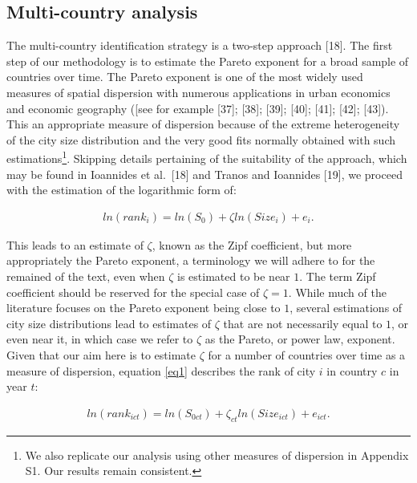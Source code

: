 \documentclass[10pt,letterpaper]{article}
\begin{document}
\hypertarget{sec3.1}{%
\subsection{Multi-country analysis}\label{sec3.1}}

The multi-country identification strategy is a two-step approach
{[}18{]}. The first step of our methodology is to estimate the Pareto
exponent \color{black} for a broad sample of countries over time. The
Pareto exponent \color{black} is one of the most widely used measures of
spatial dispersion with numerous applications in urban economics and
economic geography ({[}see for example {[}37{]}; {[}38{]}; {[}39{]};
{[}40{]}; {[}41{]}; {[}42{]}; {[}43{]}). This an appropriate measure of
dispersion because of the extreme heterogeneity of the city size
distribution and the very good fits normally obtained with such
estimations\footnote{We also replicate our analysis using other measures
  of dispersion in Appendix S1. Our results remain consistent.}.
\color{black} Skipping details pertaining of the suitability of the
approach, which may be found in Ioannides et al.~{[}18{]} and Tranos and
Ioannides {[}19{]}, we proceed with the estimation of the logarithmic
form of:

\begin{align}
ln(rank_{i}) = ln(S_0) + \zeta ln(Size_i) + e_{i}. \label{eq1}
\end{align}

This leads to an estimate of \(\zeta\), known as the Zipf coefficient,
but more appropriately the Pareto exponent, a terminology we will adhere
to for the remained of the text, even when \(\zeta\) is estimated to be
near \(1\). The term Zipf coefficient should be reserved for the special
case of \(\zeta=1\). While much of the literature focuses on the Pareto
exponent being close to \(1\), several estimations of city size
distributions lead to estimates of \(\zeta\) that are not necessarily
equal to \(1\), or even near it, in which case we refer to \(\zeta\) as
the Pareto, or power law, exponent. Given that our aim here is to
estimate \(\zeta\) for a number of countries over time as a measure of
dispersion, equation \ref{eq1} describes the rank of city \(i\) in
country \(c\) in year \(t\): \color{black}

\begin{align}
ln(rank_{ict}) = ln(S_{0ct}) + \zeta_{ct} ln(Size_{ict}) + e_{ict}. \label{eq2}
\end{align}
\end{document}
